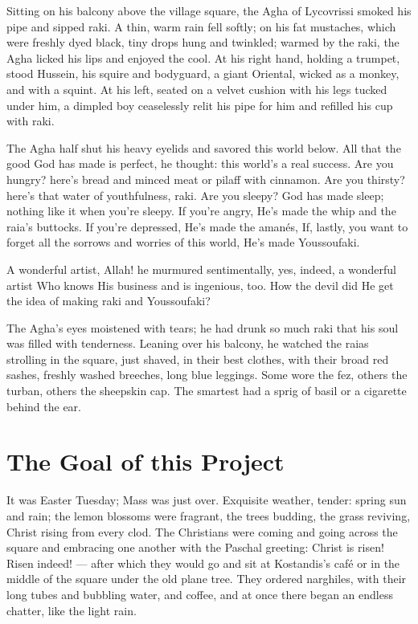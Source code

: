 \documentclass[diploma]{softlab-thesis}
\begin{document}
Sitting on his balcony above the village square, the Agha of Lycovrissi
smoked his pipe and sipped raki. A thin, warm rain fell softly; on his fat
mustaches, which were freshly dyed black, tiny drops hung and twinkled;
warmed by the raki, the Agha licked his lips and enjoyed the cool. At his
right hand, holding a trumpet, stood Hussein, his squire and bodyguard, a
giant Oriental, wicked as a monkey, and with a squint. At his left, seated
on a velvet cushion with his legs tucked under him, a dimpled boy
ceaselessly relit his pipe for him and refilled his cup with raki.

The Agha half shut his heavy eyelids and savored this world below. All that
the good God has made is perfect, he thought: this world’s a real
success. Are you hungry? here’s bread and minced meat or pilaff with
cinnamon. Are you thirsty? here’s that water of youthfulness, raki. Are you
sleepy? God has made sleep; nothing like it when you’re sleepy. If you’re
angry, He’s made the whip and the raia’s buttocks. If you’re depressed, He’s
made the amanés, If, lastly, you want to forget all the sorrows and worries
of this world, He’s made Youssoufaki.

A wonderful artist, Allah! he murmured sentimentally, yes, indeed, a
wonderful artist Who knows His business and is ingenious, too. How the devil
did He get the idea of making raki and Youssoufaki?

The Agha’s eyes moistened with tears; he had drunk so much raki that his
soul was filled with tenderness. Leaning over his balcony, he watched the
raias strolling in the square, just shaved, in their best clothes, with
their broad red sashes, freshly washed breeches, long blue leggings. Some
wore the fez, others the turban, others the sheepskin cap. The smartest had
a sprig of basil or a cigarette behind the ear.


\section{The Goal of this Project}

It was Easter Tuesday; Mass was just over. Exquisite weather, tender: spring
sun and rain; the lemon blossoms were fragrant, the trees budding, the grass
reviving, Christ rising from every clod. The Christians were coming and
going across the square and embracing one another with the Paschal greeting:
Christ is risen! Risen indeed! --- after which they would go and sit at
Kostandis’s café or in the middle of the square under the old plane
tree. They ordered narghiles, with their long tubes and bubbling water, and
coffee, and at once there began an endless chatter, like the light rain.
\end{document}
